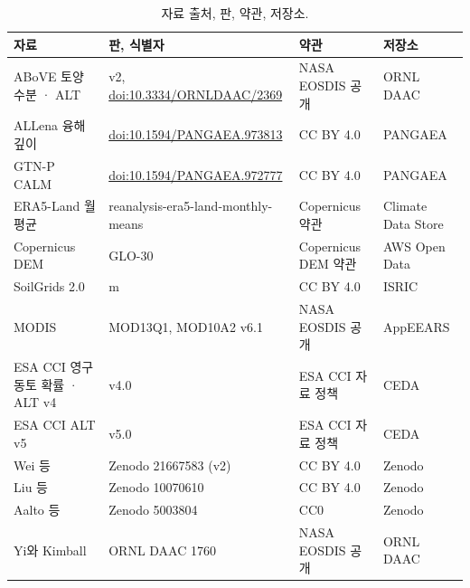 \documentclass[pdflatex,sn-nature]{sn-jnl}
\begin{document}
\begin{table}[htbp]
\caption{자료 출처, 판, 약관, 저장소.}\label{tab:s1}
\scriptsize
\begin{tabular}{@{}>{\raggedright\arraybackslash}p{}>{\raggedright\arraybackslash}p{}>{\raggedright\arraybackslash}p{}>{\raggedright\arraybackslash}p{}@{}}
\toprule
자료 & 판, 식별자 & 약관 & 저장소 \\
\midrule
ABoVE 토양 수분 · ALT\cite{Moore2025} & v2, \url{doi:10.3334/ORNLDAAC/2369} & NASA EOSDIS 공개 & ORNL DAAC \\
ALLena 융해 깊이\cite{Veremeeva2025} & \url{doi:10.1594/PANGAEA.973813} & CC BY 4.0 & PANGAEA \\
GTN-P CALM\cite{Streletskiy2025} & \url{doi:10.1594/PANGAEA.972777} & CC BY 4.0 & PANGAEA \\
ERA5-Land 월평균\cite{munozsabater2021_era5_land} & reanalysis-era5-land-monthly-means & Copernicus 약관 & Climate Data Store \\
Copernicus DEM\cite{CopDEM2021} & GLO-30 & Copernicus DEM 약관 & AWS Open Data \\
SoilGrids 2.0\cite{Poggio2021} & 250 m & CC BY 4.0 & ISRIC \\
MODIS\cite{Didan2021,HallRiggs2021} & MOD13Q1, MOD10A2 v6.1 & NASA EOSDIS 공개 & AppEEARS \\
ESA CCI 영구동토 확률 · ALT v4\cite{Westermann2024} & v4.0 & ESA CCI 자료 정책 & CEDA \\
ESA CCI ALT v5\cite{Westermann2025} & v5.0 & ESA CCI 자료 정책 & CEDA \\
Wei 등\cite{Wei2026} & Zenodo 21667583 (v2) & CC BY 4.0 & Zenodo \\
Liu 등\cite{Liu2024} & Zenodo 10070610 & CC BY 4.0 & Zenodo \\
Aalto 등\cite{Aalto2018} & Zenodo 5003804 & CC0 & Zenodo \\
Yi와 Kimball\cite{YiKimball2019} & ORNL DAAC 1760 & NASA EOSDIS 공개 & ORNL DAAC \\
\bottomrule
\end{tabular}
\end{table}
\end{document}
